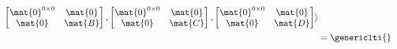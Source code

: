 \begin{example}
\begin{equation*}
\begin{aligned}
            \begin{bmatrix}\mat{0}^{0\times 0}&\mat{0}\\\mat{0}&\mat{B}\end{bmatrix},
            \begin{bmatrix}\mat{0}^{0\times 0}&\mat{0}\\\mat{0}&\mat{C}\end{bmatrix},
            \begin{bmatrix}\mat{0}^{0\times 0}&\mat{0}\\\mat{0}&\mat{D}\end{bmatrix}\rangle \\
                                                 & =\genericlti{}
        \end{aligned}
    \end{equation*}
\end{example}


